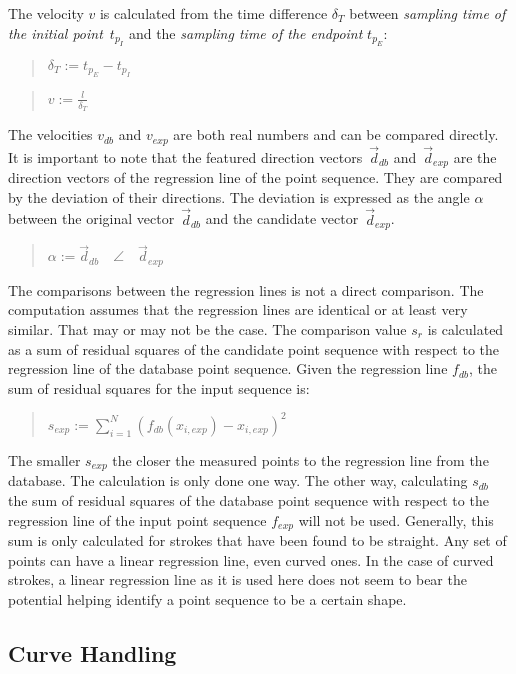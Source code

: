 The velocity \(v\) is calculated from the time 
difference \( \delta_T \) between 
\emph{sampling time of the initial point}~\(t_{p_I}\) and the 
\emph{sampling time of the endpoint} \(t_{p_E}\):
\begin{quote}
\(
    \delta_T :=
        t_{p_E} - t_{p_I}
\)
\end{quote}
\begin{quote}
\(
    v := \frac{l}{\delta_T}
\)
\end{quote}
The velocities \(v_{db}\) and \(v_{exp}\) are both real numbers and can be 
compared directly.
It is important to note that the featured direction vectors~\(\vec{d}_{db}\) 
and~\(\vec{d}_{exp}\) are the direction vectors of the regression line of the
point sequence. They are compared by the deviation of their directions.
The deviation is expressed as the angle \( \alpha \) between the 
original vector~\(\vec{d}_{db}\) and the candidate vector~\(\vec{d}_{exp}\).
\begin{quote}
\(
    \alpha := \vec{d}_{db} \quad \angle \quad \vec{d}_{exp}
\)
\end{quote}
The comparisons between the regression lines is not a direct comparison.
The computation assumes that the regression lines are identical or at least 
very similar. That may or may not be the case.
The comparison value \(s_{r}\) is calculated as a sum of residual 
squares of the candidate point sequence with respect to the regression line 
of the database point sequence.
Given the regression line \(f_{db}\), the sum of residual squares for the 
input sequence is:
\begin{quote}
\(
    s_{exp} := \sum\limits_{i=1}^{N}{(f_{db}(x_{i,exp}) - x_{i,exp})^2}
\)
\end{quote}
The smaller \(s_{exp}\) the closer the measured points to the regression line
from the database. The calculation is only done one way. The other way,
calculating \(s_{db}\) the sum of residual squares of the database point sequence
with respect to the regression line of the input point sequence \(f_{exp}\)
will not be used.
Generally, this sum is only calculated for strokes that have been found
to be straight. Any set of points can have a linear regression line, 
even curved ones. In the case of curved strokes, a linear regression line as 
it is used here does not seem to bear the potential helping identify a point 
sequence to be a certain shape.

\subsection{Curve Handling}
\label{sec:hwre:curvehandling}

